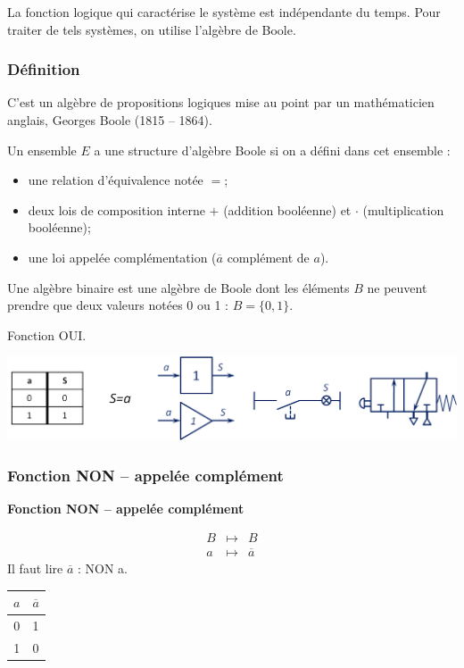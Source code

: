 \documentclass[10pt]{article}
\begin{document}
La fonction logique qui caractérise le système est indépendante du temps. Pour traiter de tels systèmes, on utilise l'algèbre de Boole. 

\subsubsection{Définition}
C'est un algèbre de propositions logiques mise au point par un mathématicien anglais, Georges Boole (1815 -- 1864).

\begin{defi}
Un ensemble $E$ a une structure d'algèbre Boole si on a défini dans cet ensemble :
\begin{itemize}
\item une relation d'équivalence notée $=$;
\item deux lois de composition interne $+$ (addition booléenne) et $\cdot$ (multiplication booléenne);
\item une loi appelée complémentation ($\overline{a}$ complément de $a$).
\end{itemize}
\end{defi}

Une algèbre binaire est une algèbre de Boole dont les éléments $B$ ne peuvent prendre que deux valeurs notées 0 ou 1 : $B=\{0,1 \}$. 

\begin{exemple}
Fonction OUI.

\begin{center}
\includegraphics[width=.9\textwidth]{images/oui}
\end{center}
\end{exemple}


\subsubsection{Fonction NON -- appelée complément}
\begin{defi}
\textbf{Fonction NON -- appelée complément}

\begin{minipage}[c]{.45\linewidth}
\begin{eqnarray*}
B &\longmapsto& B\\
a &\longmapsto& \overline{a}
\end{eqnarray*}
Il faut lire $\overline{a}$ : NON a.
\end{minipage} \hfill
\begin{minipage}[c]{.45\linewidth}
\begin{center}
\begin{tabular}{|c||c|}
\hline
$a$ & $\overline{a}$ \\
\hline
0 & 1 \\
\hline
1 & 0 \\
\hline
\end{tabular}
\end{center}
\end{minipage}
\end{defi}
\end{document}
